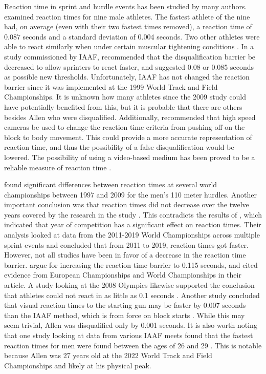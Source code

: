 \documentclass[12pt, letterpaper, titlepage]{article}
\begin{document}
Reaction time in sprint and hurdle events has been studied by many authors.
\citet{pain2007sprint} examined reaction times for nine male athletes.  The
fastest athlete of the nine had, on average (even with their two fastest times 
removed), a reaction time of 0.087 seconds and a standard deviation of 0.004
seconds.  Two other athletes were able to react similarly when under certain
muscular tightening conditions \citep{pain2007sprint}. 
In a study commissioned by IAAF,
\citet{komi2009iaaf} recommended that the disqualification 
barrier be decreased to allow sprinters to
react faster, and suggested 0.08 or 0.085 seconds as possible new thresholds.
Unfortunately, IAAF has not changed the reaction barrier since it was
implemented at the 1999 World Track and Field Championships.
It is unknown how many athletes since the 2009 study could have potentially
benefited from this, but it is probable that there are others besides Allen who
were disqualified. Additionally,
\citet{komi2009iaaf} recommended that high speed cameras be used to
change the reaction time criteria from pushing off on the block to body
movement. This could provide a more accurate representation of reaction time, 
and thus the possibility of a false disqualification would be lowered.
The possibility of using a video-based medium has been proved to be a reliable
measure of reaction time \citep{mudric2015evaluation}.


\citet{pilianidis2012start} found
significant differences between reaction times at several world championships
between 1997 and 2009 for the men's 110 meter hurdles.  Another important
conclusion was that reaction times did not decrease over the twelve years
covered by the research in the study \citep{pilianidis2012start}. This 
contradicts the results of \citet{zhang2021correlation}, which indicated that 
year of competition has a significant effect on reaction times.  Their
analysis looked at data from the 2011-2019 World Championships across multiple
sprint events and concluded that from 2011 to 2019, reaction times got
faster. However, not all studies have been in favor of a decrease in the
reaction time barrier. \citet*{brosnan2017effects} argue for increasing 
the reaction time barrier to 0.115 seconds, and cited evidence from European 
Championships and World Championships in their article.  A study looking 
at the 2008 Olympics likewise supported the conclusion that athletes could not
react in as little as 0.1 seconds \citep{lipps2011implications}.  Another study
concluded that visual reaction times to the starting gun may be faster by 0.007
seconds than the IAAF method, which is from force on block starts 
\citep{holmes2018method}.  While this may seem trivial, Allen was disqualified
only by 0.001 seconds. It is also worth noting that one study looking at data 
from various IAAF meets found that the fastest reaction times for men were found
between the ages of 26 and 29 \citep{tonnessen2013reaction}.  This is notable 
because Allen was 27 years old at the 2022 World Track and Field Championships 
and likely at his physical peak.
\end{document}
